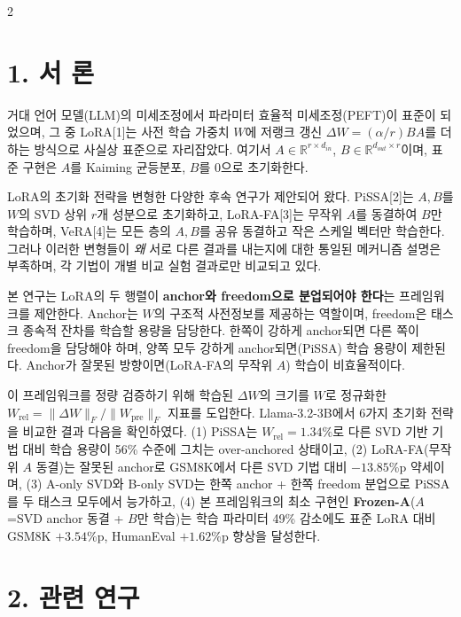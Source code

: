 \documentclass[a4paper,10pt]{article}
\begin{document}
\begin{multicols}{2}

\section*{1. 서 론}

거대 언어 모델(LLM)의 미세조정에서 파라미터 효율적 미세조정(PEFT)이 표준이 되었으며, 그 중 LoRA[1]는 사전 학습 가중치 $W$에 저랭크 갱신 $\Delta W = (\alpha/r) B A$를 더하는 방식으로 사실상 표준으로 자리잡았다. 여기서 $A \in \mathbb{R}^{r \times d_{in}}$, $B \in \mathbb{R}^{d_{out} \times r}$이며, 표준 구현은 $A$를 Kaiming 균등분포, $B$를 0으로 초기화한다.

LoRA의 초기화 전략을 변형한 다양한 후속 연구가 제안되어 왔다. PiSSA[2]는 $A,B$를 $W$의 SVD 상위 $r$개 성분으로 초기화하고, LoRA-FA[3]는 무작위 $A$를 동결하여 $B$만 학습하며, VeRA[4]는 모든 층의 $A,B$를 공유 동결하고 작은 스케일 벡터만 학습한다. 그러나 이러한 변형들이 \textit{왜} 서로 다른 결과를 내는지에 대한 통일된 메커니즘 설명은 부족하며, 각 기법이 개별 비교 실험 결과로만 비교되고 있다.

본 연구는 LoRA의 두 행렬이 \textbf{anchor와 freedom으로 분업되어야 한다}는 프레임워크를 제안한다. Anchor는 $W$의 구조적 사전정보를 제공하는 역할이며, freedom은 태스크 종속적 잔차를 학습할 용량을 담당한다. 한쪽이 강하게 anchor되면 다른 쪽이 freedom을 담당해야 하며, 양쪽 모두 강하게 anchor되면(PiSSA) 학습 용량이 제한된다. Anchor가 잘못된 방향이면(LoRA-FA의 무작위 $A$) 학습이 비효율적이다.

이 프레임워크를 정량 검증하기 위해 학습된 $\Delta W$의 크기를 $W$로 정규화한 $W_{\text{rel}} = \|\Delta W\|_F / \|W_{\text{pre}}\|_F$ 지표를 도입한다. Llama-3.2-3B에서 6가지 초기화 전략을 비교한 결과 다음을 확인하였다. (1) PiSSA는 $W_{\text{rel}}=1.34\%$로 다른 SVD 기반 기법 대비 학습 용량이 56\% 수준에 그치는 over-anchored 상태이고, (2) LoRA-FA(무작위 $A$ 동결)는 잘못된 anchor로 GSM8K에서 다른 SVD 기법 대비 $-13.85$\%p 약세이며, (3) A-only SVD와 B-only SVD는 한쪽 anchor + 한쪽 freedom 분업으로 PiSSA를 두 태스크 모두에서 능가하고, (4) 본 프레임워크의 최소 구현인 \textbf{Frozen-A}($A$=SVD anchor 동결 + $B$만 학습)는 학습 파라미터 49\% 감소에도 표준 LoRA 대비 GSM8K $+3.54$\%p, HumanEval $+1.62$\%p 향상을 달성한다.

\section*{2. 관련 연구}


\end{multicols}
\end{document}
